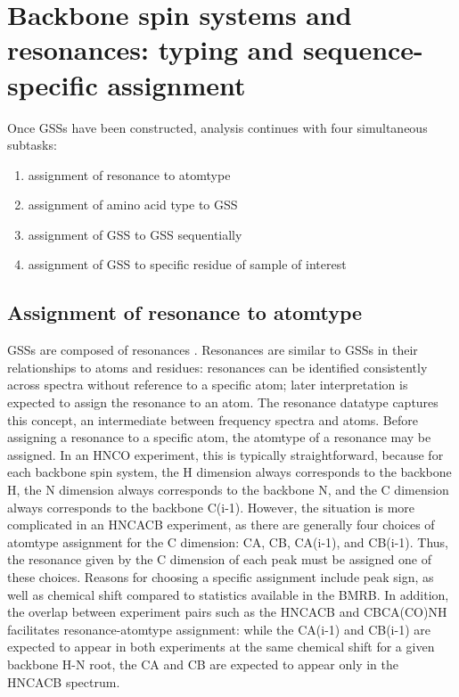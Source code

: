 \section{Backbone spin systems and resonances: typing and sequence-specific assignment}

Once GSSs have been constructed, analysis continues with four simultaneous subtasks:
\begin{enumerate}
  \item assignment of resonance to atomtype
  \item assignment of amino acid type to GSS
  \item assignment of GSS to GSS sequentially
  \item assignment of GSS to specific residue of sample of interest
\end{enumerate}

\subsection{Assignment of resonance to atomtype}
GSSs are composed of resonances \cite{ccpn}.  Resonances are 
similar to GSSs in their relationships to atoms and residues: resonances can 
be identified consistently across spectra without reference to a specific 
atom; later interpretation is expected to assign the resonance to an atom.  
The resonance datatype captures this concept, an intermediate between 
frequency spectra and atoms.  Before assigning a resonance to a specific 
atom, the atomtype of a resonance may be assigned.  In an HNCO experiment, 
this is typically straightforward, because for each backbone spin system, 
the H dimension always corresponds to the backbone H, the N dimension always 
corresponds to the backbone N, and the C dimension always corresponds to the 
backbone C(i-1).  However, the situation is more complicated in an HNCACB 
experiment, as there are generally four choices of atomtype assignment for 
the C dimension:  CA, CB, CA(i-1), and CB(i-1).  Thus, the resonance given 
by the C dimension of each peak must be assigned one of these choices.  
Reasons for choosing a specific assignment include peak sign, as well as 
chemical shift compared to statistics available in the BMRB.  In addition, 
the overlap between experiment pairs such as the HNCACB and CBCA(CO)NH 
facilitates resonance-atomtype assignment: while the CA(i-1) and CB(i-1) 
are expected to appear in both experiments at the same chemical shift for 
a given backbone H-N root, the CA and CB are expected to appear only in the 
HNCACB spectrum.

